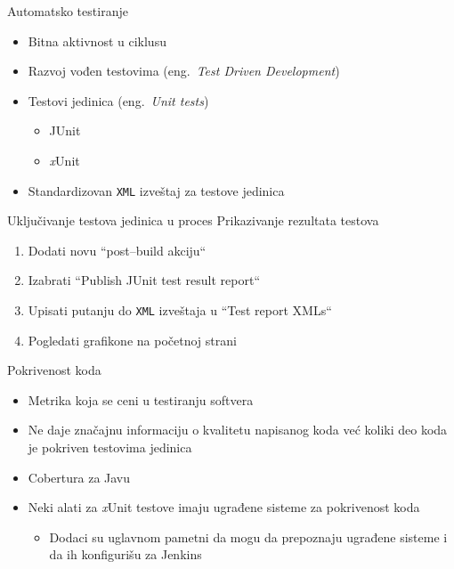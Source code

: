 \documentclass[10pt]{beamer}
\begin{document}
\begin{frame}[fragile]{Automatsko testiranje}

        
        \begin{itemize}
            \item Bitna aktivnost u ciklusu \cite{jenkins:2011}
            \item Razvoj vođen testovima (eng.~{\em Test Driven Development})
            \item Testovi jedinica (eng.~{\em Unit tests})\cite{docs:unit}
            \begin{itemize}
                \item JUnit
                \item \alert{\emph{x}Unit}
            \end{itemize}
            \item Standardizovan \texttt{XML} izveštaj za testove jedinica
        \end{itemize}

\end{frame}
\begin{frame}[fragile]{Uključivanje testova jedinica u proces}    
      Prikazivanje rezultata testova
      \begin{enumerate}
        \item Dodati novu ``post--build akciju``
        \item Izabrati ``Publish JUnit test result report`` 
        \item Upisati putanju do \texttt{XML} izveštaja u ``Test report XMLs``
        \item Pogledati grafikone na početnoj strani
      \end{enumerate}
\end{frame}

\begin{frame}[fragile]{Pokrivenost koda}
    \begin{itemize}
        \item Metrika koja se ceni u testiranju softvera
        \item Ne daje značajnu informaciju o kvalitetu napisanog koda već koliki deo koda je pokriven testovima jedinica
        \item Cobertura za Javu
        \item Neki alati za \emph{x}Unit testove imaju ugrađene sisteme za pokrivenost koda 
        \begin{itemize}
            \item Dodaci su uglavnom pametni da mogu da prepoznaju ugrađene sisteme i da ih konfigurišu za Jenkins
        \end{itemize}
    \end{itemize}
\end{frame}
\end{document}
